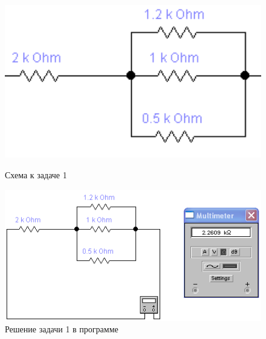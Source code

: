 \begin{figure}[H]
  \begin{center}
    \begin{minipage}[h]{0.425\linewidth}
        \includegraphics[width=1\textwidth]{authors/stepanuk-2-fig-1.png}
        \caption{Схема к задаче 1}
        \label{fig:stepanuk-2-fig-1}
    \end{minipage}
\hfill
    \begin{minipage}[h]{0.5\linewidth}
        \includegraphics[width=1\textwidth]{authors/stepanuk-2-fig-2.png}
        \caption{Решение задачи 1 в программе}
        \label{fig:stepanuk-2-fig-2}
    \end{minipage}


  \end{center}

\end{figure}
